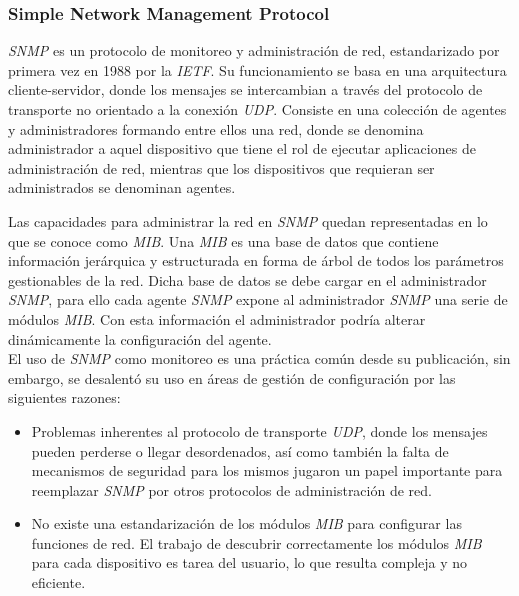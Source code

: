   \subsubsection{Simple Network Management Protocol}
  \textit{SNMP} es un protocolo de monitoreo y administración de red, estandarizado por primera vez en 1988 por la \textit{IETF}. Su funcionamiento se basa en una arquitectura cliente-servidor, donde los mensajes se intercambian a través del protocolo de transporte no orientado a la conexión \textit{UDP}. Consiste en una colección de agentes y administradores formando entre ellos una red, donde se denomina administrador a aquel dispositivo que tiene el rol de ejecutar aplicaciones de administración de red, mientras que los dispositivos que requieran ser administrados se denominan agentes.

  Las capacidades para administrar la red en \textit{SNMP} quedan representadas en lo que se conoce como \textit{MIB}. Una \textit{MIB} es una base de datos que contiene información jerárquica y estructurada en forma de árbol de todos los parámetros gestionables de la red. 
  Dicha base de datos se debe cargar en el administrador \textit{SNMP}, para ello cada agente \textit{SNMP} expone al administrador \textit{SNMP} una serie de módulos \textit{MIB}. Con esta información el administrador podría alterar dinámicamente la configuración del agente. 
  \\
  El uso de \textit{SNMP} como monitoreo es una práctica común desde su publicación, sin embargo, se desalentó su uso en áreas de gestión de configuración por las siguientes razones: 

  \begin{itemize}
	\item Problemas inherentes al protocolo de transporte \textit{UDP}, donde los mensajes pueden perderse o llegar desordenados, así como también la falta de mecanismos de seguridad para los mismos jugaron un papel importante para reemplazar \textit{SNMP} por otros protocolos de administración de red.
	\item No existe una estandarización de los módulos \textit{MIB} para configurar las funciones de red. El trabajo de descubrir correctamente los módulos \textit{MIB} para cada dispositivo es tarea del usuario, lo que resulta compleja y no eficiente.
\end{itemize}

